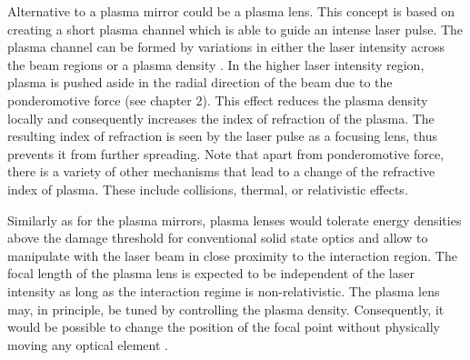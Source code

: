 Alternative to a plasma mirror could be a plasma lens. This concept is based on creating a short plasma channel which is able to guide an intense laser pulse. The plasma channel can be formed by variations in either the laser intensity across the beam regions or a plasma density \cite{Katzir2009}. In the higher laser intensity region, plasma is pushed aside in the radial direction of the beam due to the ponderomotive force (see chapter 2). This effect reduces the plasma density locally and consequently increases the index of refraction of the plasma. The resulting index of refraction is seen by the laser pulse as a focusing lens, thus prevents it from further spreading. Note that apart from ponderomotive force, there is a variety of other mechanisms that lead to a change of the refractive index of plasma. These include collisions, thermal, or relativistic effects.

Similarly as for the plasma mirrors, plasma lenses would tolerate energy densities above the damage threshold for conventional solid state optics and allow to manipulate with the laser beam in close proximity to the interaction region. The focal length of the plasma lens is expected to be independent of the laser intensity as long as the interaction regime is non-relativistic. The plasma lens may, in principle, be tuned by controlling the plasma density. Consequently, it would be possible to change the position of the focal point without physically moving any optical element \cite{Katzir2009, Fang2006}.